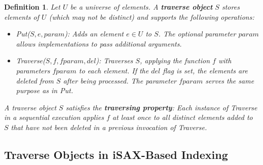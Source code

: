 \documentclass[a4paper,11pt,twoside,openany]{book}
\newtheorem{definition}{Definition}
\begin{document}
\begin{definition}
\label{def:traverse}
Let $U$ be a universe of elements. A \textbf{traverse object} $S$ stores elements
of $U$ (which may not be distinct) and supports the following operations:

\begin{itemize}
    \item \textit{Put}($S,e,\mathit{param}$): Adds an element $e \in U$ to $S$.
    The optional parameter $\mathit{param}$ allows implementations to pass
    additional arguments.
    
    \item \textit{Traverse}($S,f,\mathit{fparam},del$): Traverses $S$, applying
    the function $f$ with parameters $\mathit{fparam}$ to each element. If the
    $del$ flag is set, the elements are deleted from $S$ after being processed.
    The parameter $\mathit{fparam}$ serves the same purpose as in \textit{Put}.
\end{itemize}

A traverse object $S$ satisfies the \textbf{traversing property}:  
Each instance of \textit{Traverse} in a sequential execution applies $f$ at
least once to all distinct elements added to $S$ that have not been deleted
in a previous invocation of \textit{Traverse}.
\end{definition}

\subsection{Traverse Objects in iSAX-Based Indexing}
\end{document}
